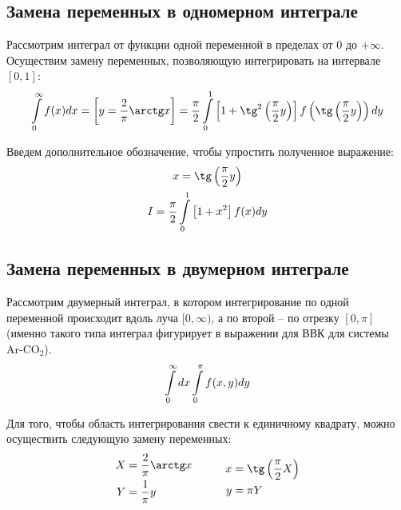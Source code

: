 \documentclass[12pt]{article}
\newcommand{\vverh}{\vspace*{-0.3cm}}
\begin{document}
\subsection*{Замена переменных в одномерном интеграле}

Рассмотрим интеграл от функции одной переменной в пределах от $0$ до $+\infty$. Осуществим замену переменных, позволяющую интегрировать на интервале $[0, 1]$:
\vverh
\begin{gather}
		\int\limits_{0}^{\infty} f(x) d x = \left[ y = \frac{2}{\pi} \arctg x \right] = \frac{\pi}{2} \int\limits_{0}^{1} \left[ 1 + \tg^2 \left( \frac{\pi}{2} y \right) \right] f \left( \tg \left( \frac{\pi}{2} y \right) \right) dy \notag 
\end{gather}

Введем дополнительное обозначение, чтобы упростить полученное выражение:
\vverh
\begin{gather}
		x = \tg \left( \frac{\pi}{2} y \right) \notag \\
	I = \frac{\pi}{2} \int\limits_{0}^{1} \left[ 1 + x^2 \right] f (x) dy \notag
\end{gather}

\subsection*{Замена переменных в двумерном интеграле}

Рассмотрим двумерный интеграл, в котором интегрирование по одной переменной происходит вдоль луча $[0, \infty)$, а по второй -- по отрезку $\left[ 0, \pi \right]$ (именно такого типа интеграл фигурирует в выражении для ВВК для системы Ar-CO$_2$).
\vverh
\begin{gather}
		\int\limits_{0}^{\infty} dx \int\limits_{0}^{\pi} f(x, y) dy \notag
\end{gather}

Для того, чтобы область интегрирования свести к единичному квадрату, можно осуществить следующую замену переменных:
\vverh
\begin{gather}
	\begin{aligned}
			X &= \frac{2}{\pi} \arctg x \\
			Y &= \frac{1}{\pi} y
	\end{aligned}
	\quad \quad \quad 
	\begin{aligned}
			x &= \tg \left( \frac{\pi}{2} X \right) \\ 
			y &=\pi Y
	\end{aligned}
	\notag
\end{gather}
\end{document}
